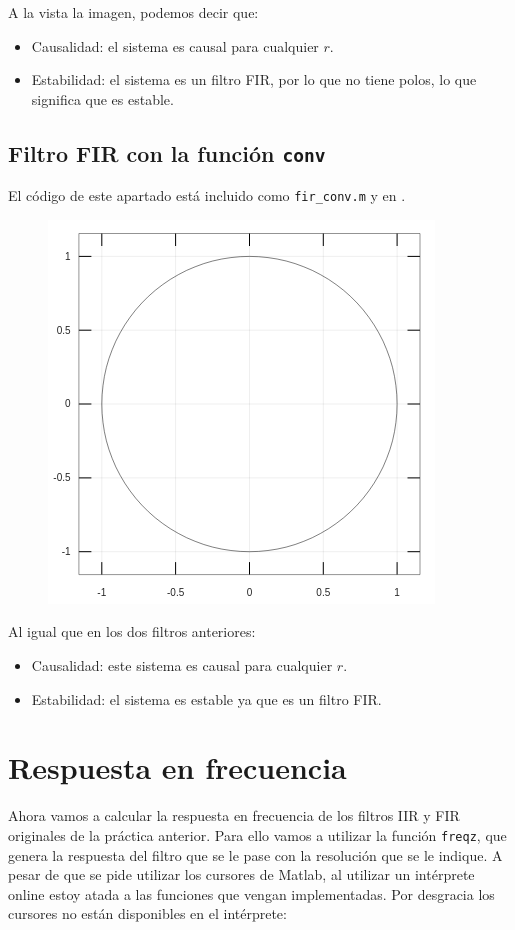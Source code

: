 \documentclass[11pt,a4paper]{article}
\begin{document}
A la vista la imagen, podemos decir que:

\begin{itemize}
	\item Causalidad: el sistema es causal para cualquier $r$.
	\item Estabilidad: el sistema es un filtro FIR, por lo que no tiene polos, lo que significa que es estable.
\end{itemize}

\subsection{Filtro FIR con la función \texttt{conv}}

El código de este apartado está incluido como \texttt{fir\_conv.m} y en \color{deepred}\color{black}.\\

\begin{figure}[H]
  \centering
  \includegraphics[width=0.5\linewidth]{img/polosg4.png}
\end{figure}

Al igual que en los dos filtros anteriores:

\begin{itemize}
	\item Causalidad: este sistema es causal para cualquier $r$.
	\item Estabilidad: el sistema es estable ya que es un filtro FIR.
\end{itemize}
\newpage

\section{Respuesta en frecuencia}

Ahora vamos a calcular la respuesta en frecuencia de los filtros IIR y FIR originales de la práctica anterior. Para ello vamos a utilizar la función \texttt{freqz}, que genera la respuesta del filtro que se le pase con la resolución que se le indique. A pesar de que se pide utilizar los cursores de Matlab, al utilizar un intérprete online estoy atada a las funciones que vengan implementadas. Por desgracia los cursores no están disponibles en el intérprete:
\end{document}
